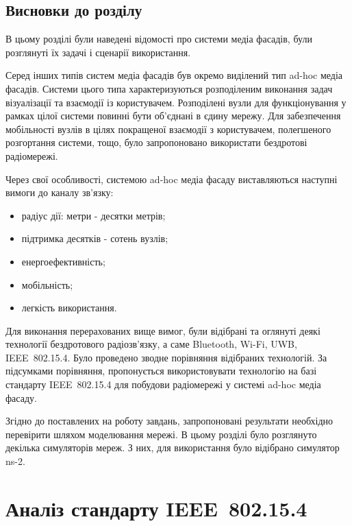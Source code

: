 \documentclass[a4paper,ukrainian,utf8,nocolumnsxix,floatsection,equationsection]{eskdtext}
\newcommand{\todoi}[1]{\todo[inline]{#1}}
\newcommand{\iee}[0]{IEEE~802.15.4\xspace}
\begin{document}


\subsection{Висновки до розділу}

В цьому розділі були наведені відомості про системи медіа фасадів, були розглянуті їх задачі і сценарії використання. 

Серед інших типів систем медіа фасадів був окремо виділений тип ad-hoc медіа фасадів. Системи цього типа характеризуються розподіленим виконання задач візуалізації та взаємодії із користувачем. Розподілені вузли для функціонування у рамках цілої системи повинні бути об’єднані в єдину мережу. Для забезпечення мобільності вузлів в цілях покращеної взаємодії з користувачем, полегшеного розгортання системи, тощо, було запропоновано використати бездротові радіомережі.

Через свої особливості, системою ad-hoc медіа фасаду виставляються наступні вимоги до каналу зв’язку:
\begin{itemize}
	\item радіус дії: метри - десятки метрів;
	\item підтримка десятків - сотень вузлів;
	\item енергоефективність;
	\item мобільність;
	\item легкість використання.
\end{itemize}

Для виконання перерахованих вище вимог, були відібрані та оглянуті деякі технології бездротового радіозв’язку, а саме Bluetooth, Wi-Fi, UWB, \iee. Було проведено зводне порівняння відібраних технологій. За підсумками порівняння, пропонується використовувати технологію на базі стандарту \iee для побудови радіомережі у системі ad-hoc медіа фасаду. 

Згідно до поставлених на роботу завдань, запропоновані результати необхідно перевірити шляхом моделювання мережі. В цьому розділі було розглянуто декілька симуляторів мереж. З них, для використання було відібрано симулятор ns-2.



\section{Аналіз стандарту \iee}
\label{sec:ieee:standard:analysis}
\end{document}
